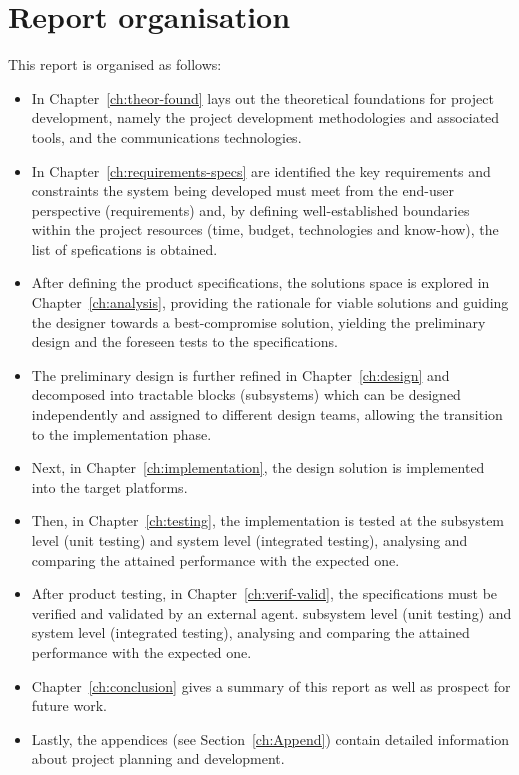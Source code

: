 %
\section{Report organisation}
This report is organised as follows:
\begin{itemize}
\item In Chapter~\ref{ch:theor-found} lays out the theoretical foundations for
  project development,
  namely the project development methodologies and associated tools, and the
  communications technologies.
\item In Chapter~\ref{ch:requirements-specs} are identified the key requirements
  and constraints the system being developed must meet from the end-user
  perspective (requirements) and, by defining well-established boundaries within
  the project resources (time, budget, technologies and know-how), the list of
  spefications is obtained.
\item After defining the product specifications, the solutions space is explored
  in Chapter~\ref{ch:analysis}, providing the rationale for viable solutions and
  guiding the designer towards a best-compromise solution, yielding the
  preliminary design and the foreseen tests to the specifications.
\item The preliminary design is further refined in Chapter~\ref{ch:design} and
  decomposed into tractable blocks (subsystems) which can be designed
  independently and assigned to different design teams, allowing the transition
  to the implementation phase.
\item Next, in Chapter~\ref{ch:implementation}, the design solution is
  implemented into the target platforms.
\item Then, in Chapter~\ref{ch:testing}, the implementation is tested at the
  subsystem level (unit testing) and system level (integrated testing),
  analysing and comparing the attained performance with the expected one.
\item After product testing, in Chapter~\ref{ch:verif-valid}, the specifications
  must be verified and validated by an external agent.
  subsystem level (unit testing) and system level (integrated testing),
  analysing and comparing the attained performance with the expected one.
\item Chapter~\ref{ch:conclusion} gives a summary of this report as well as
  prospect for future work.
\item Lastly, the appendices (see Section~\ref{ch:Append}) contain detailed
  information about project planning and development.
\end{itemize}
